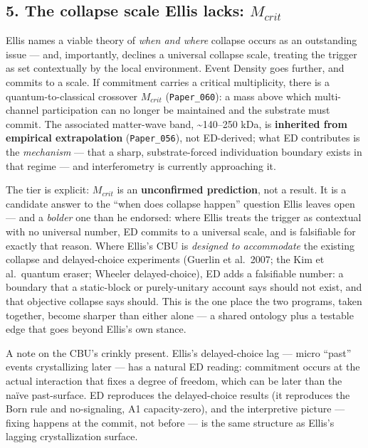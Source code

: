 \documentclass[
  11pt,
]{article}
\begin{document}
\subsection{\texorpdfstring{5. The collapse scale Ellis lacks:
\(M_{crit}\)}{5. The collapse scale Ellis lacks: M\_\{crit\}}}\label{the-collapse-scale-ellis-lacks-m_crit}

Ellis names a viable theory of \emph{when and where} collapse occurs as
an outstanding issue --- and, importantly, declines a universal collapse
scale, treating the trigger as set contextually by the local
environment. Event Density goes further, and commits to a scale. If
commitment carries a critical multiplicity, there is a
quantum-to-classical crossover \(M_{crit}\) (\texttt{Paper\_060}): a
mass above which multi-channel participation can no longer be maintained
and the substrate must commit. The associated matter-wave band,
\textasciitilde140--250 kDa, is \textbf{inherited from empirical
extrapolation} (\texttt{Paper\_056}), not ED-derived; what ED
contributes is the \emph{mechanism} --- that a sharp, substrate-forced
individuation boundary exists in that regime --- and interferometry is
currently approaching it.

The tier is explicit: \(M_{crit}\) is an \textbf{unconfirmed
prediction}, not a result. It is a candidate answer to the ``when does
collapse happen'' question Ellis leaves open --- and a \emph{bolder} one
than he endorsed: where Ellis treats the trigger as contextual with no
universal number, ED commits to a universal scale, and is falsifiable
for exactly that reason. Where Ellis's CBU is \emph{designed to
accommodate} the existing collapse and delayed-choice experiments
(Guerlin et al.~2007; the Kim et al.~quantum eraser; Wheeler
delayed-choice), ED adds a falsifiable number: a boundary that a
static-block or purely-unitary account says should not exist, and that
objective collapse says should. This is the one place the two programs,
taken together, become sharper than either alone --- a shared ontology
plus a testable edge that goes beyond Ellis's own stance.

A note on the CBU's crinkly present. Ellis's delayed-choice lag ---
micro ``past'' events crystallizing later --- has a natural ED reading:
commitment occurs at the actual interaction that fixes a degree of
freedom, which can be later than the naïve past-surface. ED reproduces
the delayed-choice results (it reproduces the Born rule and
no-signaling, A1 capacity-zero), and the interpretive picture --- fixing
happens at the commit, not before --- is the same structure as Ellis's
lagging crystallization surface.
\end{document}
